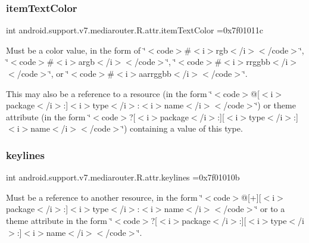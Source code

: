 \subsubsection{\texorpdfstring{item\+Text\+Color}{itemTextColor}}
{\footnotesize\ttfamily int android.\+support.\+v7.\+mediarouter.\+R.\+attr.\+item\+Text\+Color =0x7f01011c\hspace{0.3cm}{\ttfamily [static]}}

Must be a color value, in the form of \char`\"{}$<$code$>$\#$<$i$>$rgb$<$/i$>$$<$/code$>$\char`\"{}, \char`\"{}$<$code$>$\#$<$i$>$argb$<$/i$>$$<$/code$>$\char`\"{}, \char`\"{}$<$code$>$\#$<$i$>$rrggbb$<$/i$>$$<$/code$>$\char`\"{}, or \char`\"{}$<$code$>$\#$<$i$>$aarrggbb$<$/i$>$$<$/code$>$\char`\"{}. 

This may also be a reference to a resource (in the form \char`\"{}$<$code$>$@\mbox{[}$<$i$>$package$<$/i$>$\+:\mbox{]}$<$i$>$type$<$/i$>$\+:$<$i$>$name$<$/i$>$$<$/code$>$\char`\"{}) or theme attribute (in the form \char`\"{}$<$code$>$?\mbox{[}$<$i$>$package$<$/i$>$\+:\mbox{]}\mbox{[}$<$i$>$type$<$/i$>$\+:\mbox{]}$<$i$>$name$<$/i$>$$<$/code$>$\char`\"{}) containing a value of this type. \mbox{\label{classandroid_1_1support_1_1v7_1_1mediarouter_1_1R_1_1attr_a53b6bbac28b9bdef73522b0d16a6a6dc}} 
\subsubsection{\texorpdfstring{keylines}{keylines}}
{\footnotesize\ttfamily int android.\+support.\+v7.\+mediarouter.\+R.\+attr.\+keylines =0x7f01010b\hspace{0.3cm}{\ttfamily [static]}}

Must be a reference to another resource, in the form \char`\"{}$<$code$>$@\mbox{[}+\mbox{]}\mbox{[}$<$i$>$package$<$/i$>$\+:\mbox{]}$<$i$>$type$<$/i$>$\+:$<$i$>$name$<$/i$>$$<$/code$>$\char`\"{} or to a theme attribute in the form \char`\"{}$<$code$>$?\mbox{[}$<$i$>$package$<$/i$>$\+:\mbox{]}\mbox{[}$<$i$>$type$<$/i$>$\+:\mbox{]}$<$i$>$name$<$/i$>$$<$/code$>$\char`\"{}. \mbox{\label{classandroid_1_1support_1_1v7_1_1mediarouter_1_1R_1_1attr_a7936d1b6f472a1418ca17e8942f5f989}} 
